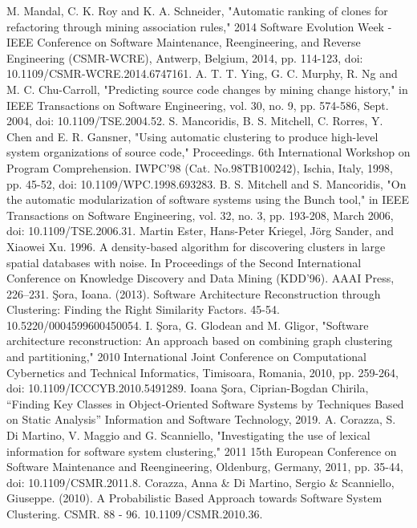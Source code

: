 \documentclass{ieeeaccess}
\begin{document}
\begin{thebibliography}{00}
 M. Mandal, C. K. Roy and K. A. Schneider, "Automatic ranking of clones for refactoring through mining association rules," 2014 Software Evolution Week - IEEE Conference on Software Maintenance, Reengineering, and Reverse Engineering (CSMR-WCRE), Antwerp, Belgium, 2014, pp. 114-123, doi: 10.1109/CSMR-WCRE.2014.6747161.
 A. T. T. Ying, G. C. Murphy, R. Ng and M. C. Chu-Carroll, "Predicting source code changes by mining change history," in IEEE Transactions on Software Engineering, vol. 30, no. 9, pp. 574-586, Sept. 2004, doi: 10.1109/TSE.2004.52.
 S. Mancoridis, B. S. Mitchell, C. Rorres, Y. Chen and E. R. Gansner, "Using automatic clustering to produce high-level system organizations of source code," Proceedings. 6th International Workshop on Program Comprehension. IWPC'98 (Cat. No.98TB100242), Ischia, Italy, 1998, pp. 45-52, doi: 10.1109/WPC.1998.693283.
 B. S. Mitchell and S. Mancoridis, "On the automatic modularization of software systems using the Bunch tool," in IEEE Transactions on Software Engineering, vol. 32, no. 3, pp. 193-208, March 2006, doi: 10.1109/TSE.2006.31. 
 Martin Ester, Hans-Peter Kriegel, Jörg Sander, and Xiaowei Xu. 1996. A density-based algorithm for discovering clusters in large spatial databases with noise. In Proceedings of the Second International Conference on Knowledge Discovery and Data Mining (KDD'96). AAAI Press, 226–231.
 Şora, Ioana. (2013). Software Architecture Reconstruction through Clustering: Finding the Right Similarity Factors. 45-54. 10.5220/0004599600450054. 
 I. Şora, G. Glodean and M. Gligor, "Software architecture reconstruction: An approach based on combining graph clustering and partitioning," 2010 International Joint Conference on Computational Cybernetics and Technical Informatics, Timisoara, Romania, 2010, pp. 259-264, doi: 10.1109/ICCCYB.2010.5491289.
 Ioana Şora, Ciprian-Bogdan Chirila, “Finding Key Classes in Object-Oriented Software Systems by Techniques Based on Static Analysis”  Information and Software Technology, 2019.
 A. Corazza, S. Di Martino, V. Maggio and G. Scanniello, "Investigating the use of lexical information for software system clustering," 2011 15th European Conference on Software Maintenance and Reengineering, Oldenburg, Germany, 2011, pp. 35-44, doi: 10.1109/CSMR.2011.8.
 Corazza, Anna \& Di Martino, Sergio \& Scanniello, Giuseppe. (2010). A Probabilistic Based Approach towards Software System Clustering. CSMR. 88 - 96. 10.1109/CSMR.2010.36. 

\end{thebibliography}
\end{document}
